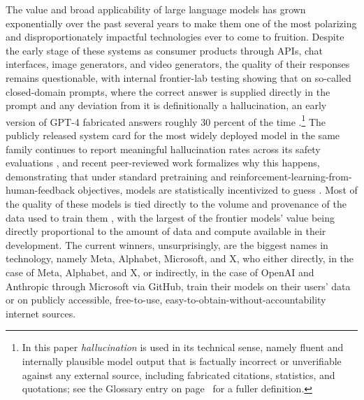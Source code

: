 \documentclass[10pt,a4paper,twocolumn]{article}
\begin{document}
The value and broad applicability of large language models has grown exponentially over the past several years to make them one of the most polarizing and disproportionately impactful technologies ever to come to fruition. Despite the early stage of these systems as consumer products through APIs, chat interfaces, image generators, and video generators, the quality of their responses remains questionable, with internal frontier-lab testing showing that on so-called closed-domain prompts, where the correct answer is supplied directly in the prompt and any deviation from it is definitionally a hallucination, an early version of GPT-4 fabricated answers roughly 30 percent of the time \citep[ch.~11]{hao2025empire}.\footnote{In this paper \emph{hallucination} is used in its technical sense, namely fluent and internally plausible model output that is factually incorrect or unverifiable against any external source, including fabricated citations, statistics, and quotations; see the Glossary entry on page~\pageref{sec:appendix-glossary} for a fuller definition.} The publicly released system card for the most widely deployed model in the same family continues to report meaningful hallucination rates across its safety evaluations \citep{openai2024gpt4osystemcard}, and recent peer-reviewed work formalizes why this happens, demonstrating that under standard pretraining and reinforcement-learning-from-human-feedback objectives, models are statistically incentivized to guess \citep{kalai2025whyhallucinate}. Most of the quality of these models is tied directly to the volume and provenance of the data used to train them \citep{kaplan2020scaling}, with the largest of the frontier models' value being directly proportional to the amount of data and compute available in their development. The current winners, unsurprisingly, are the biggest names in technology, namely Meta, Alphabet, Microsoft, and X, who either directly, in the case of Meta, Alphabet, and X, or indirectly, in the case of OpenAI and Anthropic through Microsoft via GitHub, train their models on their users' data or on publicly accessible, free-to-use, easy-to-obtain-without-accountability internet sources.
\end{document}
